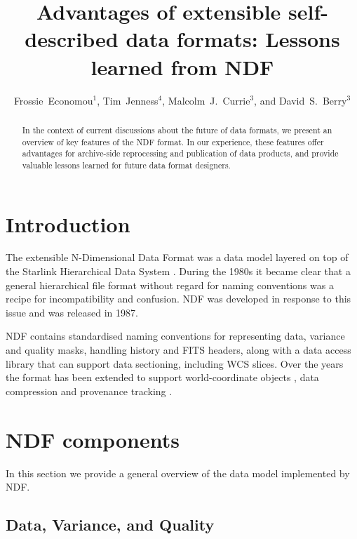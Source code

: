 \documentclass[11pt,twoside]{article}
\begin{document}
\title{Advantages of extensible self-described data formats: Lessons learned from NDF}
\author{Frossie~Economou$^1$, Tim~Jenness$^4$, Malcolm~J.~Currie$^3$,
and David~S.~Berry$^3$
}

\begin{abstract}
  In the context of current discussions about the future of data
  formats, we present an overview of key features of the NDF
  format. In our experience, these features offer advantages for
  archive-side reprocessing and publication of data products, and
  provide valuable lessons learned for future data format designers.
\end{abstract}

\section{Introduction}

The extensible N-Dimensional Data Format
\citep[NDF;][]{1988STARB...2...11C,1993ASPC...52..229W,SGP38} was a
data model layered on top of the Starlink Hierarchical Data System
\citep[HDS;][]{1982QJRAS..23..485D}. During the 1980s it became clear
that a general hierarchical file format without regard for naming
conventions was a recipe for incompatibility and confusion. NDF was
developed in response to this issue and was released in 1987.

NDF contains standardised naming conventions for representing data,
variance and quality masks, handling history and FITS headers, along
with a data access library that can support data sectioning, including
WCS slices. Over the years the format has been extended to support
world-coordinate objects \citep{2001ASPC..238..129B}, data compression
\citep{2008ASPC..394..650C} and provenance tracking
\citep{2009ASPC..411..418J}.

\section{NDF components}

In this section we provide a general overview of the data model
implemented by NDF.

\subsection{Data, Variance, and Quality}
\end{document}
